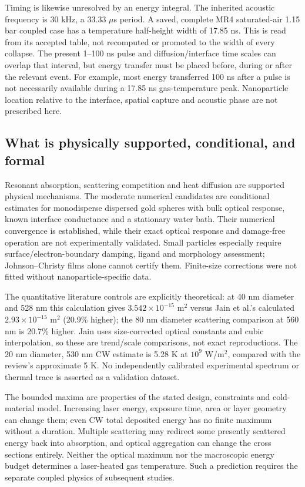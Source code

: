 \documentclass[10pt,a4paper]{article}
\begin{document}
Timing is likewise unresolved by an energy integral. The inherited acoustic frequency is 30 kHz, a 33.33 $\mu$s period. A saved, complete MR4 saturated-air 1.15 bar coupled case has a temperature half-height width of 17.85 ns. This is read from its accepted table, not recomputed or promoted to the width of every collapse. The present 1--100 ns pulse and diffusion/interface time scales can overlap that interval, but energy transfer must be placed before, during or after the relevant event. For example, most energy transferred 100 ns after a pulse is not necessarily available during a 17.85 ns gas-temperature peak. Nanoparticle location relative to the interface, spatial capture and acoustic phase are not prescribed here.

\subsection*{What is physically supported, conditional, and formal}
Resonant absorption, scattering competition and heat diffusion are supported physical mechanisms. The moderate numerical candidates are conditional estimates for monodisperse dispersed gold spheres with bulk optical response, known interface conductance and a stationary water bath. Their numerical convergence is established, while their exact optical response and damage-free operation are not experimentally validated. Small particles especially require surface/electron-boundary damping, ligand and morphology assessment; Johnson--Christy films alone cannot certify them. Finite-size corrections were not fitted without nanoparticle-specific data.

The quantitative literature controls are explicitly theoretical: at 40 nm diameter and 528 nm this calculation gives $3.542\times10^{-15}$ m$^2$ versus Jain et al.'s calculated $2.93\times10^{-15}$ m$^2$ (20.9\% higher); the 80 nm diameter scattering comparison at 560 nm is 20.7\% higher. Jain uses size-corrected optical constants and cubic interpolation, so these are trend/scale comparisons, not exact reproductions. The 20 nm diameter, 530 nm CW estimate is 5.28 K at $10^9$ W/m$^2$, compared with the review's approximate 5 K. No independently calibrated experimental spectrum or thermal trace is asserted as a validation dataset.

The bounded maxima are properties of the stated design, constraints and cold-material model. Increasing laser energy, exposure time, area or layer geometry can change them; even CW total deposited energy has no finite maximum without a duration. Multiple scattering may redirect some presently scattered energy back into absorption, and optical aggregation can change the cross sections entirely. Neither the optical maximum nor the macroscopic energy budget determines a laser-heated gas temperature. Such a prediction requires the separate coupled physics of subsequent studies.
\end{document}
